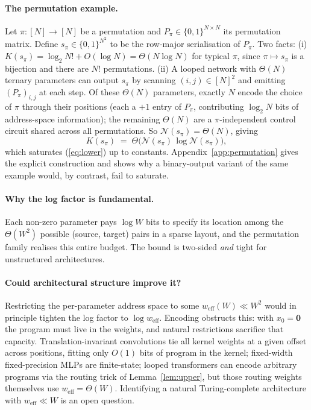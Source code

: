 \documentclass{article}
\theoremstyle{definition}
\newcommand{\B}{\{0,1\}}
\newcommand{\nc}{\mathcal{N}}
\begin{document}
\paragraph{The permutation example.} Let $\pi : [N] \to [N]$ be a permutation and $P_\pi \in \{0,1\}^{N \times N}$
its permutation matrix. Define $s_\pi \in \B^{N^2}$ to be the row-major
serialisation of $P_\pi$. Two facts: (i) $K(s_\pi) = \log_2 N! + O(\log N) =
  \Theta(N \log N)$ for typical $\pi$, since $\pi \mapsto s_\pi$ is a bijection
and there are $N!$ permutations. (ii) A looped network with $\Theta(N)$ ternary
parameters can output $s_\pi$ by scanning $(i, j) \in [N]^2$ and emitting
$(P_\pi)_{i,j}$ at each step. Of these $\Theta(N)$ parameters, exactly $N$
encode the choice of $\pi$ through their positions (each a $+1$ entry of
$P_\pi$, contributing $\log_2 N$ bits of address-space information); the
remaining $\Theta(N)$ are a $\pi$-independent control circuit shared across all
permutations. So $\nc(s_\pi) = \Theta(N)$, giving
\[
  K(s_\pi) \;=\; \Theta\!\bigl(\nc(s_\pi)\,\log \nc(s_\pi)\bigr),
\]
which saturates (\ref{eq:lower}) up to constants.
Appendix~\ref{app:permutation} gives the explicit construction and shows why a
binary-output variant of the same example would, by contrast, fail to saturate.

\paragraph{Why the log factor is fundamental.} Each non-zero parameter pays $\log W$ bits to specify its location among the
$\Theta(W^2)$ possible (source, target) pairs in a sparse layout, and the
permutation family realises this entire budget. The bound is two-sided
\emph{and} tight for unstructured architectures.

\paragraph{Could architectural structure improve it?} Restricting the per-parameter address space to some $w_{\mathrm{eff}}(W) \ll
  W^2$ would in principle tighten the log factor to $\log w_{\mathrm{eff}}$.
Encoding obstructs this: with $x_0 = \mathbf{0}$ the program must live in the
weights, and natural restrictions sacrifice that capacity.
Translation-invariant convolutions tie all kernel weights at a given offset
across positions, fitting only $O(1)$ bits of program in the kernel;
fixed-width fixed-precision MLPs are finite-state; looped transformers can
encode arbitrary programs via the routing trick of Lemma~\ref{lem:upper}, but
those routing weights themselves use $w_{\mathrm{eff}} = \Theta(W)$.
Identifying a natural Turing-complete architecture with $w_{\mathrm{eff}} \ll
  W$ is an open question.
\end{document}
